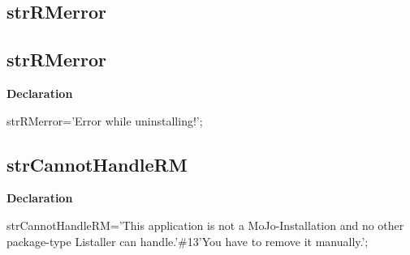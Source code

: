 \documentclass{report}
\newif\ifpdf
\begin{document}
\subsection*{\large{\textbf{strRMerror}}\normalsize\hspace{1ex}\hrulefill}
\else
\subsection*{strRMerror}
\fi
\label{trstrings-strRMerror}
\begin{list}{}{
\setlength{\itemindent}{0cm}
\setlength{\listparindent}{0cm}
\setlength{\leftmargin}{\evensidemargin}
\addtolength{\leftmargin}{\tmplength}
\settowidth{\labelsep}{X}
\addtolength{\leftmargin}{\labelsep}
\setlength{\labelwidth}{\tmplength}
}
\item[\textbf{Declaration}\hfill]
\ifpdf
\begin{flushleft}
\fi
\begin{ttfamily}
strRMerror='Error while uninstalling!';\end{ttfamily}

\ifpdf
\end{flushleft}
\fi

\end{list}
\ifpdf
\subsection*{\large{\textbf{strCannotHandleRM}}\normalsize\hspace{1ex}\hrulefill}
\else
\subsection*{strCannotHandleRM}
\fi
\label{trstrings-strCannotHandleRM}
\begin{list}{}{
\setlength{\itemindent}{0cm}
\setlength{\listparindent}{0cm}
\setlength{\leftmargin}{\evensidemargin}
\addtolength{\leftmargin}{\tmplength}
\settowidth{\labelsep}{X}
\addtolength{\leftmargin}{\labelsep}
\setlength{\labelwidth}{\tmplength}
}
\item[\textbf{Declaration}\hfill]
\ifpdf
\begin{flushleft}
\fi
\begin{ttfamily}
strCannotHandleRM='This application is not a MoJo-Installation and no other package-type Listaller can handle.'{\#}13'You have to remove it manually.';\end{ttfamily}

\ifpdf
\end{flushleft}
\fi

\end{list}
\ifpdf
\end{document}
